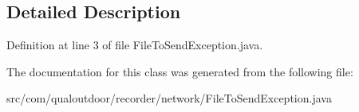 \subsection{Detailed Description}


Definition at line 3 of file File\-To\-Send\-Exception.\-java.



The documentation for this class was generated from the following file\-:\begin{DoxyCompactItemize}
\item 
src/com/qualoutdoor/recorder/network/File\-To\-Send\-Exception.\-java\end{DoxyCompactItemize}
